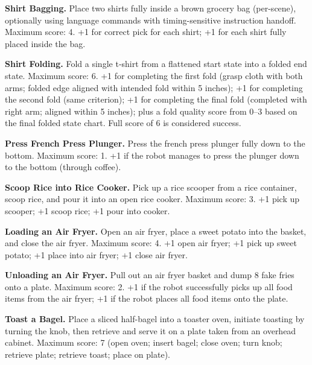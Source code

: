 \noindent \textbf{Shirt Bagging.} Place two shirts fully inside a brown grocery bag (per-scene), optionally using language commands with timing-sensitive instruction handoff.
Maximum score: 4. +1 for correct pick for each shirt; +1 for each shirt fully placed inside the bag.

\noindent \textbf{Shirt Folding.} Fold a single t‑shirt from a flattened start state into a folded end state.
Maximum score: 6. +1 for completing the first fold (grasp cloth with both arms; folded edge aligned with intended fold within 5 inches); +1 for completing the second fold (same criterion); +1 for completing the final fold (completed with right arm; aligned within 5 inches); plus a fold quality score from 0–3 based on the final folded state chart. Full score of 6 is considered success.

\noindent \textbf{Press French Press Plunger.} Press the french press plunger fully down to the bottom.
Maximum score: 1. +1 if the robot manages to press the plunger down to the bottom (through coffee).

\noindent \textbf{Scoop Rice into Rice Cooker.} Pick up a rice scooper from a rice container, scoop rice, and pour it into an open rice cooker.
Maximum score: 3. +1 pick up scooper; +1 scoop rice; +1 pour into cooker.

\noindent \textbf{Loading an Air Fryer.} Open an air fryer, place a sweet potato into the basket, and close the air fryer.
Maximum score: 4. +1 open air fryer; +1 pick up sweet potato; +1 place into air fryer; +1 close air fryer.

\noindent \textbf{Unloading an Air Fryer.} Pull out an air fryer basket and dump 8 fake fries onto a plate. Maximum score: 2. +1 if the robot successfully picks up all food items from the air fryer; +1 if the robot places all food items onto the plate.

\noindent \textbf{Toast a Bagel.} Place a sliced half-bagel into a toaster oven, initiate toasting by turning the knob, then retrieve and serve it on a plate taken from an overhead cabinet.
Maximum score: 7 (open oven; insert bagel; close oven; turn knob; retrieve plate; retrieve toast; place on plate).


